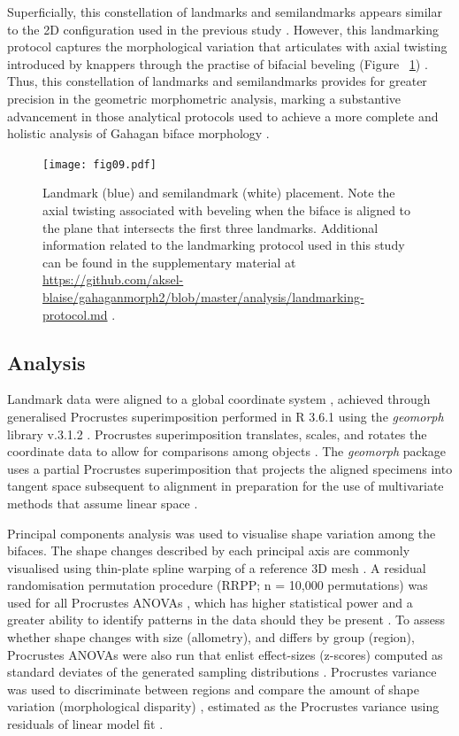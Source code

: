 \documentclass[review]{elsarticle}
\begin{document}
Superficially, this constellation of landmarks and semilandmarks appears similar to the 2D configuration used in the previous study \citep{RN11783}. However, this landmarking protocol captures the morphological variation that articulates with axial twisting introduced by knappers through the practise of bifacial beveling (Figure ~\ref{fig:fig09}) \citep{RN20850}. Thus, this constellation of landmarks and semilandmarks provides for greater precision in the geometric morphometric analysis, marking a substantive advancement in those analytical protocols used to achieve a more complete and holistic analysis of Gahagan biface morphology \citep{RN20850}.

\begin{figure}[h]\centering
\texttt{[image: fig09.pdf]}
\caption{Landmark (blue) and semilandmark (white) placement. Note the axial twisting associated with beveling when the biface is aligned to the plane that intersects the first three landmarks. Additional information related to the landmarking protocol used in this study can be found in the supplementary material at \href{https://github.com/aksel-blaise/gahaganmorph2/blob/master/analysis/landmarking-protocol.md}{https://github.com/aksel-blaise/gahaganmorph2/blob/master/analysis/landmarking-protocol.md} \citep{RN20850}.}
\label{fig:fig09}
\end{figure}

\subsection*{Analysis}

Landmark data were aligned to a global coordinate system \citep{RN11622,RN11623,RN11563}, achieved through generalised Procrustes superimposition \citep{RN478} performed in R 3.6.1 \citep{R} using the \textit{geomorph} library v.3.1.2 \citep{RN11530,RN1774}. Procrustes superimposition translates, scales, and rotates the coordinate data to allow for comparisons among objects \citep{RN11564,RN478}. The \textit{geomorph} package uses a partial Procrustes superimposition that projects the aligned specimens into tangent space subsequent to alignment in preparation for the use of multivariate methods that assume linear space \citep{RN1646,RN11563}.

Principal components analysis \citep{RN1746} was used to visualise shape variation among the bifaces. The shape changes described by each principal axis are commonly visualised using thin-plate spline warping of a reference 3D mesh \citep{RN1731,RN479}. A residual randomisation permutation procedure (RRPP; n = 10,000 permutations) was used for all Procrustes ANOVAs \citep{RN1655,RN11775}, which has higher statistical power and a greater ability to identify patterns in the data should they be present \citep{RN1719}. To assess whether shape changes with size (allometry), and differs by group (region), Procrustes ANOVAs \citep{RN1749} were also run that enlist effect-sizes (z-scores) computed as standard deviates of the generated sampling distributions \citep{RN1756}. Procrustes variance was used to discriminate between regions and compare the amount of shape variation (morphological disparity) \citep{RN11560}, estimated as the Procrustes variance using residuals of linear model fit \citep{RN11530}.
\end{document}
